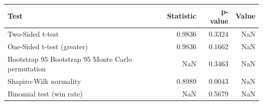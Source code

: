 \begin{tabular}{lrrr}
\toprule
Test & Statistic & p-value & Value \\
\midrule
Two-Sided t-test & 0.9836 & 0.3324 & NaN \\
One-Sided t-test (greater) & 0.9836 & 0.1662 & NaN \\
Bootstrap 95%
Bootstrap 95%
Monte Carlo permutation & NaN & 0.3463 & NaN \\
Shapiro-Wilk normality & 0.8989 & 0.0043 & NaN \\
Binomial test (win rate) & NaN & 0.5679 & NaN \\
\bottomrule
\end{tabular}
